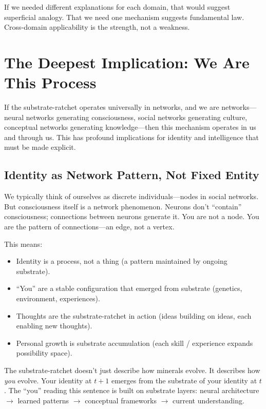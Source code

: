 \documentclass[12pt,a4paper]{article}
\begin{document}
If we needed different explanations for each domain, that would suggest superficial analogy. That we need one mechanism suggests fundamental law. Cross-domain applicability is the strength, not a weakness.

\section{The Deepest Implication: We Are This Process}

If the substrate-ratchet operates universally in networks, and we are networks---neural networks generating consciousness, social networks generating culture, conceptual networks generating knowledge---then this mechanism operates in us and through us. This has profound implications for identity and intelligence that must be made explicit.

\subsection{Identity as Network Pattern, Not Fixed Entity}

We typically think of ourselves as discrete individuals---nodes in social networks. But consciousness itself is a network phenomenon. Neurons don't ``contain'' consciousness; connections between neurons generate it. You are not a node. You are the pattern of connections---an edge, not a vertex.

This means:
\begin{itemize}
    \item Identity is a process, not a thing (a pattern maintained by ongoing substrate).
    \item ``You'' are a stable configuration that emerged from substrate (genetics, environment, experiences).
    \item Thoughts are the substrate-ratchet in action (ideas building on ideas, each enabling new thoughts).
    \item Personal growth is substrate accumulation (each skill / experience expands possibility space).
\end{itemize}

The substrate-ratchet doesn't just describe how minerals evolve. It describes how \emph{you} evolve. Your identity at $t{+}1$ emerges from the substrate of your identity at $t$. The ``you'' reading this sentence is built on substrate layers: neural architecture $\rightarrow$ learned patterns $\rightarrow$ conceptual frameworks $\rightarrow$ current understanding.
\end{document}
